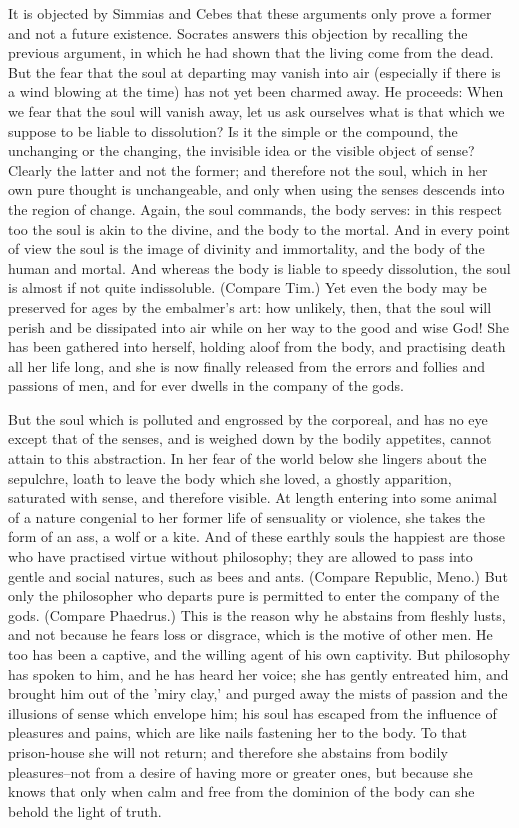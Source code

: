 It is objected by Simmias and Cebes that these arguments only prove a
former and not a future existence. Socrates answers this objection by
recalling the previous argument, in which he had shown that the living
come from the dead. But the fear that the soul at departing may vanish
into air (especially if there is a wind blowing at the time) has not yet
been charmed away. He proceeds: When we fear that the soul will vanish
away, let us ask ourselves what is that which we suppose to be liable
to dissolution? Is it the simple or the compound, the unchanging or the
changing, the invisible idea or the visible object of sense? Clearly the
latter and not the former; and therefore not the soul, which in her own
pure thought is unchangeable, and only when using the senses descends
into the region of change. Again, the soul commands, the body serves:
in this respect too the soul is akin to the divine, and the body to the
mortal. And in every point of view the soul is the image of divinity and
immortality, and the body of the human and mortal. And whereas the
body is liable to speedy dissolution, the soul is almost if not quite
indissoluble. (Compare Tim.) Yet even the body may be preserved for ages
by the embalmer's art: how unlikely, then, that the soul will perish and
be dissipated into air while on her way to the good and wise God!
She has been gathered into herself, holding aloof from the body, and
practising death all her life long, and she is now finally released from
the errors and follies and passions of men, and for ever dwells in the
company of the gods.

But the soul which is polluted and engrossed by the corporeal, and has
no eye except that of the senses, and is weighed down by the bodily
appetites, cannot attain to this abstraction. In her fear of the world
below she lingers about the sepulchre, loath to leave the body which
she loved, a ghostly apparition, saturated with sense, and therefore
visible. At length entering into some animal of a nature congenial to
her former life of sensuality or violence, she takes the form of an ass,
a wolf or a kite. And of these earthly souls the happiest are those who
have practised virtue without philosophy; they are allowed to pass into
gentle and social natures, such as bees and ants. (Compare Republic,
Meno.) But only the philosopher who departs pure is permitted to enter
the company of the gods. (Compare Phaedrus.) This is the reason why he
abstains from fleshly lusts, and not because he fears loss or disgrace,
which is the motive of other men. He too has been a captive, and the
willing agent of his own captivity. But philosophy has spoken to him,
and he has heard her voice; she has gently entreated him, and brought
him out of the 'miry clay,' and purged away the mists of passion and
the illusions of sense which envelope him; his soul has escaped from the
influence of pleasures and pains, which are like nails fastening her to
the body. To that prison-house she will not return; and therefore she
abstains from bodily pleasures--not from a desire of having more or
greater ones, but because she knows that only when calm and free from
the dominion of the body can she behold the light of truth.

